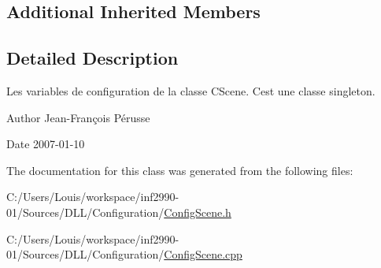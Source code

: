 \subsection*{Additional Inherited Members}


\subsection{Detailed Description}
Les variables de configuration de la classe C\+Scene. C\textquotesingle{}est une classe singleton. 

\begin{DoxyAuthor}{Author}
Jean-\/\+François Pérusse 
\end{DoxyAuthor}
\begin{DoxyDate}{Date}
2007-\/01-\/10 
\end{DoxyDate}


The documentation for this class was generated from the following files\+:\begin{DoxyCompactItemize}
\item 
C\+:/\+Users/\+Louis/workspace/inf2990-\/01/\+Sources/\+D\+L\+L/\+Configuration/\hyperlink{_config_scene_8h}{Config\+Scene.\+h}\item 
C\+:/\+Users/\+Louis/workspace/inf2990-\/01/\+Sources/\+D\+L\+L/\+Configuration/\hyperlink{_config_scene_8cpp}{Config\+Scene.\+cpp}\end{DoxyCompactItemize}
